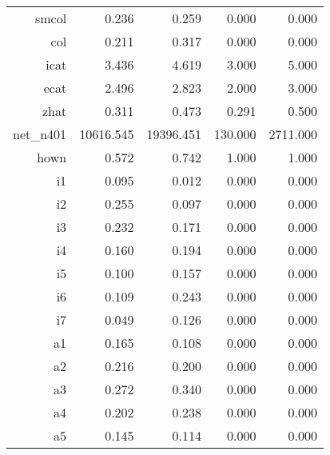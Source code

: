 \begin{table}[ht]
\begin{tabular}{rrrrr}
  smcol & 0.236 & 0.259 & 0.000 & 0.000 \\ 
  col & 0.211 & 0.317 & 0.000 & 0.000 \\ 
  icat & 3.436 & 4.619 & 3.000 & 5.000 \\ 
  ecat & 2.496 & 2.823 & 2.000 & 3.000 \\ 
  zhat & 0.311 & 0.473 & 0.291 & 0.500 \\ 
  net\_n401 & 10616.545 & 19396.451 & 130.000 & 2711.000 \\ 
  hown & 0.572 & 0.742 & 1.000 & 1.000 \\ 
  i1 & 0.095 & 0.012 & 0.000 & 0.000 \\ 
  i2 & 0.255 & 0.097 & 0.000 & 0.000 \\ 
  i3 & 0.232 & 0.171 & 0.000 & 0.000 \\ 
  i4 & 0.160 & 0.194 & 0.000 & 0.000 \\ 
  i5 & 0.100 & 0.157 & 0.000 & 0.000 \\ 
  i6 & 0.109 & 0.243 & 0.000 & 0.000 \\ 
  i7 & 0.049 & 0.126 & 0.000 & 0.000 \\ 
  a1 & 0.165 & 0.108 & 0.000 & 0.000 \\ 
  a2 & 0.216 & 0.200 & 0.000 & 0.000 \\ 
  a3 & 0.272 & 0.340 & 0.000 & 0.000 \\ 
  a4 & 0.202 & 0.238 & 0.000 & 0.000 \\ 
  a5 & 0.145 & 0.114 & 0.000 & 0.000 \\ 
   \hline
\end{tabular}
\end{table}
